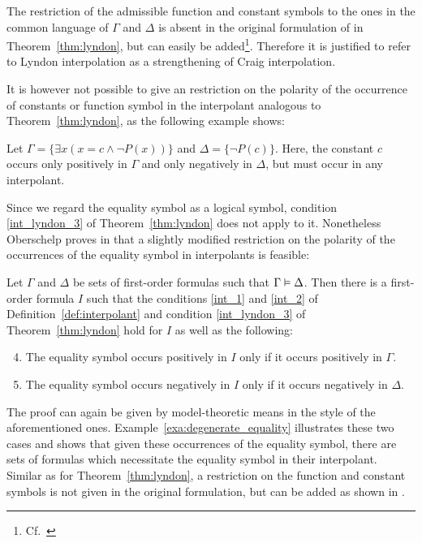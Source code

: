 The restriction of the admissible function and constant symbols to the ones in the common language of $\Gamma$ and $\Delta$ is absent in the original formulation of in Theorem~\ref{thm:lyndon}, but can easily be added\footnote{Cf.\ \cite{motohashi84}}.
Therefore it is justified to refer to Lyndon interpolation as a strengthening of Craig interpolation.

It is however not possible to give an restriction on the polarity of the occurrence of constants or function symbol in the interpolant analogous to Theorem~\ref{thm:lyndon}, as the following example shows: 

\begin{exa}
	Let $\Gamma = \{ \exists x ( x = c \land \lnot P(x)) \}$ and $\Delta = \{ \lnot P(c) \}$.
	Here, the constant $c$ occurs only positively in $\Gamma$ and only negatively in $\Delta$, but must occur in any interpolant.
\end{exa}

Since we regard the equality symbol as a logical symbol, condition \ref{int_lyndon_3} of Theorem~\ref{thm:lyndon} does not apply to it.
Nonetheless
Oberschelp proves in \cite{oberschelp68} that a slightly modified restriction on the polarity of the occurrences of the equality symbol in interpolants is feasible:

\begin{thm}[Oberschelp]
	\label{thm:oberschelp}
	Let $\Gamma$ and $\Delta$ be sets of first-order formulas such that $\Gamma \entails\nolinebreak \Delta$. 
	Then there is a first-order formula $I$ such that the conditions \ref{int_1} and \ref{int_2} of Definition~\ref{def:interpolant} and condition \ref{int_lyndon_3} of Theorem~\ref{thm:lyndon} hold for $I$ as well as the following:

	\begin{enumerate}%
		\setcounter{enumi}{3}
		\item 
			The equality symbol occurs positively in $I$ only if it occurs positively in $\Gamma$.
		\item
			The equality symbol occurs negatively in $I$ only if it occurs negatively in\nolinebreak{} $\Delta$.
	\end{enumerate}
\end{thm}

The proof can again be given by model-theoretic means in the style of the aforementioned ones.
Example~\ref{exa:degenerate_equality} illustrates these two cases and shows that given these occurrences of the equality symbol, there are sets of formulas which necessitate the equality symbol in their interpolant.
Similar as for Theorem~\ref{thm:lyndon}, a restriction on the function and constant symbols is not given in the original formulation, but can be added as shown in \cite{fujiwara78}.

